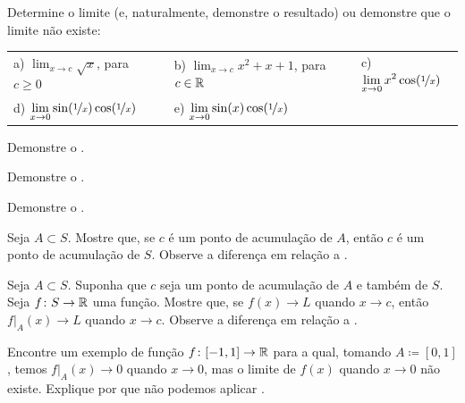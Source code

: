 \begin{exercise}
Determine o limite (e, naturalmente, demonstre o resultado) ou demonstre que o limite não
existe:

\medskip

\noindent
\begin{tabular}{lllll}
a)
$\displaystyle
\lim_{x\to c} \sqrt{x}
$, para $c \geq 0$
& &
b)
$\displaystyle
\lim_{x\to c} x^2+x+1
$, para $c \in {\mathbb{R}}$
& &
c)
$\displaystyle
\lim_{x\to 0} x^2 \cos (\nicefrac{1}{x})
$
\\
d)
$\displaystyle
\lim_{x\to 0} \sin(\nicefrac{1}{x}) \cos (\nicefrac{1}{x})
$
& &
e)
$\displaystyle
\lim_{x\to 0} \sin(x) \cos (\nicefrac{1}{x})
$ & 
\end{tabular}
\end{exercise}

\begin{exercise}
Demonstre o .
\end{exercise}

\begin{exercise}
Demonstre o .
\end{exercise}

\begin{exercise}
Demonstre o .
\end{exercise}

\begin{exercise}
Seja $A \subset S$. Mostre que, se $c$ é um ponto de acumulação de $A$, então $c$
é um ponto de acumulação de $S$. Observe a diferença em relação a
.
\end{exercise}

\begin{exercise} \label{exercise:restrictionlimitexercise}
Seja $A \subset S$. Suponha que $c$ seja um ponto de acumulação de $A$ e
também de $S$.
Seja $f \colon S \to {\mathbb{R}}$ uma função. Mostre que, se
$f(x) \to L$ quando $x \to c$, então
$f|_A(x) \to L$ quando $x \to c$.
Observe a diferença em relação a
.
\end{exercise}

\begin{exercise}
Encontre um exemplo de função $f \colon [-1,1] \to {\mathbb{R}}$ para a qual, tomando
$A\coloneqq [0,1]$, temos
$f|_A(x) \to 0$ quando $x \to 0$, mas o limite de $f(x)$ quando $x \to 0$
não existe. Explique por que não podemos aplicar
.
\end{exercise}

